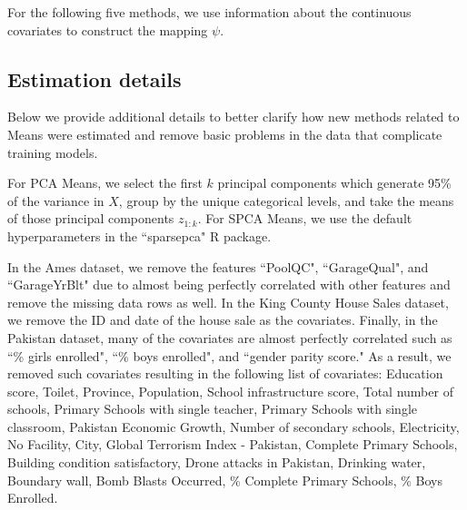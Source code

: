 \documentclass{article}
\theoremstyle{plain}
\theoremstyle{definition}
\theoremstyle{remark}
\begin{document}
For the following five methods, we use information about the continuous covariates to construct the mapping $\psi$.

\subsection{Estimation details}\label{subsec:estim}

Below we provide additional details to better clarify how new methods related to Means were estimated and remove basic problems in the data that complicate training models.

For PCA Means, we select the first $k$ principal components which generate 95\% of the variance in $X$, group by the unique categorical levels, and take the means of those principal components $z_{1:k}$. For SPCA Means, we use the default hyperparameters in the ``sparsepca" R package. %

In the Ames dataset, we remove the features ``PoolQC", ``GarageQual", and ``GarageYrBlt" due to almost being perfectly correlated with other features and remove the missing data rows as well. In the King County House Sales dataset, we remove the ID and date of the house sale as the covariates. Finally, in the Pakistan dataset, many of the covariates are almost perfectly correlated such as ``\% girls enrolled", ``\% boys enrolled", and ``gender parity score." As a result, we removed such covariates resulting in the following list of covariates: Education score, Toilet, Province, Population, School infrastructure score, Total number of schools, Primary Schools with single teacher, Primary Schools with single classroom, Pakistan Economic Growth, Number of secondary schools, Electricity, No Facility, City, Global Terrorism Index - Pakistan, Complete Primary Schools, Building condition satisfactory, Drone attacks in Pakistan, Drinking water, Boundary wall, Bomb Blasts Occurred, \% Complete Primary Schools, \% Boys Enrolled.







\end{document}
